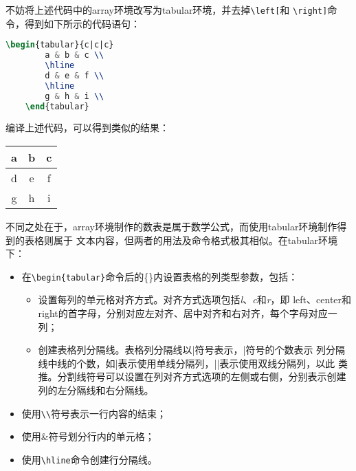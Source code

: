 不妨将上述代码中的array环境改写为tabular环境，并去掉\texttt{\textbackslash{}left[}和
\texttt{\textbackslash{}right]}命令，得到如下所示的代码语句：
\begin{lstlisting}[language=TeX]
    \begin{tabular}{c|c|c}
        a & b & c \\
        \hline
        d & e & f \\
        \hline
        g & h & i \\
    \end{tabular}        
\end{lstlisting}

编译上述代码，可以得到类似的结果：
\begin{center}
    \begin{tabular}{c|c|c}
        a & b & c \\
        \hline
        d & e & f \\
        \hline
        g & h & i \\
    \end{tabular}
\end{center}

不同之处在于，array环境制作的数表是属于数学公式，而使用tabular环境制作得到的表格则属于
文本内容，但两者的用法及命令格式极其相似。在tabular环境下：
\begin{itemize}
    \item 在\texttt{\textbackslash{}begin\{tabular\}}命令后的\{\}内设置表格的列类型参数，包括：
          \begin{itemize}
              \item 设置每列的单元格对齐方式。对齐方式选项包括\emph{l}、\emph{c}和\emph{r}，即
                    left、center和right的首字母，分别对应左对齐、居中对齐和右对齐，每个字母对应一列；
              \item 创建表格列分隔线。表格列分隔线以|符号表示，|符号的个数表示
                    列分隔线中线的个数，如|表示使用单线分隔列，||表示使用双线分隔列，以此
                    类推。分割线符号可以设置在列对齐方式选项的左侧或右侧，分别表示创建列的左分隔线和右分隔线。
          \end{itemize}
    \item 使用\texttt{\textbackslash{}\textbackslash{}}符号表示一行内容的结束；
    \item 使用\&符号划分行内的单元格；
    \item 使用\texttt{\textbackslash{}hline}命令创建行分隔线。
\end{itemize}

